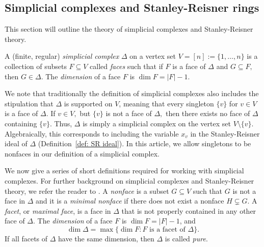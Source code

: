 \subsection{Simplicial complexes and Stanley-Reisner rings}
\label{subsec: simplicial complexes and Stanley-Reisner rings}
This section will outline the theory of simplicial complexes and Stanley-Reisner theory.
\begin{definition}
    A (finite, regular) \emph{simplicial complex} $\Delta$ on a vertex set $V = [n] :=\{1,\ldots,n\}$ is a collection of subsets $F\subseteq V$ called \emph{faces} such that if $F$ is a face of $\Delta$ and $G\subseteq F,$ then $G\in\Delta.$ The \emph{dimension} of a face $F$ is $\dim F = |F| - 1.$
\end{definition}
\begin{remark}
    We note that traditionally the definition of simplicial complexes also includes the stipulation that $\Delta$ is supported on $V$, meaning that every singleton $\{v\}$ for $v\in V$ is a face of $\Delta.$ 
    If $v\in V,$ but $\{v\}$ is not a face of $\Delta,$ then there exists no face of $\Delta$ containing $\{v\}.$ Thus, $\Delta$ is simply a simplicial complex on the vertex set $V\setminus\{v\}.$ Algebraically, this corresponds to including the variable $x_v$ in the Stanley-Reisner ideal of $\Delta$ (Definition~\ref{def: SR ideal}). 
    In this article, we allow singletons to be nonfaces in our definition of a simplicial complex. 
\end{remark}
We now give a series of short definitions required for working with simplicial complexes. For further background on simplicial complexes and Stanley-Reisner theory, we refer the reader to \cite{BrunsHerzog1993, MillerSturmfels2005,Stanley1996}. A \emph{nonface} is a subset $G\subseteq V$ such that $G$ is not a face in $\Delta$ and it is a \emph{minimal nonface} if there does not exist a nonface $H\subsetneq G$.  
A \emph{facet}, or \emph{maximal face}, is a face in $\Delta$ that is not properly contained in any other face of $\Delta$. The \emph{dimension} of a face $F$ is $\dim F = |F|-1$, and
\[
\dim\Delta = \max\{\dim F : F\text{ is a facet of }\Delta\}.
\]
If all facets of $\Delta$ have the same dimension, then $\Delta$ is called \emph{pure}.

